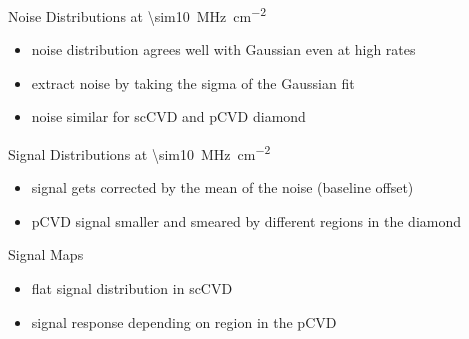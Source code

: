 \begin{frame}{Noise Distributions at \SI{\sim10}{\mega\hertz\per\centi\meter^2}}
 
	\begin{figure}\vspace*{-15pt}
		\centering
	\end{figure}\vspace*{-10pt}

	\begin{itemize} \itemfill
		\item noise distribution agrees well with Gaussian even at high rates
		\item extract noise by taking the sigma of the Gaussian fit
		\item noise similar for scCVD and pCVD diamond
	\end{itemize}
 
\end{frame}
\begin{frame}{Signal Distributions at \SI{\sim10}{\mega\hertz\per\centi\meter^2}}
 
	\begin{figure}\vspace*{-15pt}
		\centering
	\end{figure}\vspace*{-10pt}

	\begin{itemize} \itemfill
		\item signal gets corrected by the mean of the noise (baseline offset)
		\item pCVD signal smaller and smeared by different regions in the diamond
	\end{itemize}
 
\end{frame}
\begin{frame}{Signal Maps}
 
	\begin{figure}\vspace*{-15pt}
		\centering
	\end{figure}
	
	\begin{itemize} \itemfill
		\item flat signal distribution in scCVD
		\item signal response depending on region in the pCVD
	\end{itemize}
 
\end{frame}
